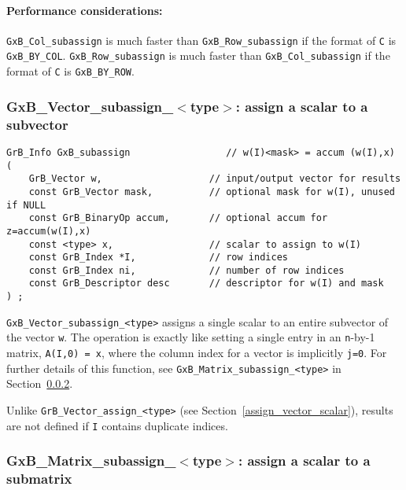 \documentclass[12pt]{article}
\begin{document}
\paragraph{\bf Performance considerations:} %
\verb'GxB_Col_subassign' is much faster than \verb'GxB_Row_subassign' if the
format of \verb'C' is \verb'GxB_BY_COL'.  \verb'GxB_Row_subassign' is much
faster than \verb'GxB_Col_subassign' if the format of \verb'C' is
\verb'GxB_BY_ROW'.

\subsubsection{{\sf GxB\_Vector\_subassign\_$<$type$>$:} assign a scalar to a subvector}
\label{subassign_vector_scalar}

\begin{mdframed}[userdefinedwidth=6in]
{\footnotesize
\begin{verbatim}
GrB_Info GxB_subassign                 // w(I)<mask> = accum (w(I),x)
(
    GrB_Vector w,                   // input/output vector for results
    const GrB_Vector mask,          // optional mask for w(I), unused if NULL
    const GrB_BinaryOp accum,       // optional accum for z=accum(w(I),x)
    const <type> x,                 // scalar to assign to w(I)
    const GrB_Index *I,             // row indices
    const GrB_Index ni,             // number of row indices
    const GrB_Descriptor desc       // descriptor for w(I) and mask
) ;
\end{verbatim} } \end{mdframed}

\verb'GxB_Vector_subassign_<type>' assigns a single scalar to an entire
subvector of the vector \verb'w'.  The operation is exactly like setting a
single entry in an \verb'n'-by-1 matrix, \verb'A(I,0) = x', where the column
index for a vector is implicitly \verb'j=0'.  For further details of this
function, see \verb'GxB_Matrix_subassign_<type>' in
Section~\ref{subassign_matrix_scalar}.

Unlike \verb'GrB_Vector_assign_<type>' (see Section~\ref{assign_vector_scalar}),
results are not defined if \verb'I' contains duplicate indices.

\newpage
\subsubsection{{\sf GxB\_Matrix\_subassign\_$<$type$>$:} assign a scalar to a submatrix}
\label{subassign_matrix_scalar}
\end{document}
